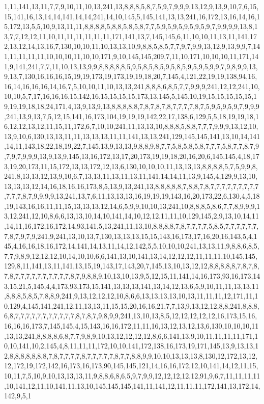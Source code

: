 1,11,141,13,11,7,7,9,10,11,10,13,241,13,8,8,8,5,8,7,5,9,7,9,9,9,13,12,9,13,9,10,7,6,15,15,141,16,13,14,14,141,14,14,241,14,10,145,5,145,141,13,13,241,16,172,13,16,14,16,15,172,13,5,5,10,9,13,11,11,8,8,8,8,5,8,8,5,8,5,8,7,7,5,9,5,9,5,9,5,9,5,9,7,9,9,9,9,13,8,13,7,7,12,12,11,10,11,11,11,11,11,11,171,141,13,7,145,145,6,11,10,10,11,13,11,141,172,13,12,14,13,16,7,130,10,10,11,10,13,13,10,9,8,8,5,8,5,7,7,9,7,9,9,13,12,9,13,9,9,7,141,11,11,11,11,10,10,10,11,10,10,171,9,10,145,145,209,7,11,10,171,10,10,10,11,171,141,9,141,241,7,7,11,10,13,13,9,9,8,8,8,8,8,5,9,5,8,5,8,5,9,5,8,5,9,5,9,5,9,9,7,9,8,9,9,13,9,13,7,130,16,16,16,15,19,19,173,19,173,19,19,18,20,7,145,4,121,22,19,19,138,94,16,16,14,16,16,16,14,16,7,5,10,10,11,10,13,13,241,8,8,8,6,8,5,7,7,9,9,9,241,12,12,241,10,10,10,5,7,17,16,16,16,15,142,16,15,15,15,15,173,13,145,5,145,10,19,15,15,15,15,15,19,19,19,18,18,24,171,4,13,9,13,9,13,8,8,8,8,8,7,8,7,8,7,8,7,7,7,7,8,7,5,9,5,9,5,9,7,9,9,9,241,13,9,13,7,5,12,15,141,16,173,104,19,19,19,142,22,17,138,6,129,5,5,18,19,19,18,16,12,12,13,12,11,15,11,172,6,7,10,10,241,11,13,13,10,8,8,8,5,8,8,7,7,7,9,9,9,13,12,10,13,9,10,6,130,13,13,11,11,13,13,13,11,11,141,13,13,241,129,145,145,141,13,10,14,141,14,11,143,18,22,18,19,22,7,145,13,9,13,13,9,8,8,9,8,7,7,5,8,5,8,5,8,7,7,7,5,8,7,7,8,7,9,7,9,7,9,9,9,13,9,13,9,145,13,16,172,13,17,20,173,19,19,18,20,16,20,6,145,145,4,18,173,19,20,173,11,15,172,13,13,172,12,13,6,130,10,10,10,11,13,13,13,8,8,8,8,5,7,5,9,9,8,241,8,13,13,12,13,9,10,6,7,13,13,11,13,11,13,11,141,14,14,11,13,9,145,4,129,9,13,10,13,13,13,12,14,16,18,16,16,173,8,5,13,9,13,241,13,8,8,8,8,8,7,8,8,7,8,7,7,7,7,7,7,7,7,7,7,7,7,8,7,9,9,9,9,13,241,13,7,6,11,13,13,13,16,19,19,19,143,16,20,173,22,6,130,4,5,18,19,143,16,16,11,11,15,13,13,13,12,14,6,5,9,9,10,10,13,241,10,8,8,8,5,8,6,7,7,8,9,9,9,13,12,241,12,10,8,6,6,13,13,10,14,10,141,14,10,12,12,11,11,10,129,145,2,9,13,10,14,11,14,11,16,172,16,172,14,93,141,5,13,241,11,13,10,8,8,8,8,7,8,7,7,7,7,5,8,5,7,7,7,7,7,7,7,8,7,9,7,9,241,9,241,13,10,13,7,130,13,13,13,15,15,143,16,173,17,16,20,16,143,5,4,145,4,16,16,18,16,172,14,141,14,13,11,14,12,142,5,5,10,10,10,241,13,13,11,9,8,8,6,8,5,7,7,9,8,9,12,12,12,10,14,10,10,6,6,141,13,10,141,13,14,12,12,12,11,11,11,10,145,145,129,8,11,141,13,11,141,13,15,19,143,17,143,20,7,145,13,10,13,12,12,8,8,8,8,8,7,8,7,8,7,8,7,7,7,7,7,7,7,7,7,7,8,7,9,8,8,9,10,13,10,13,9,5,12,15,11,141,14,16,173,93,16,173,143,15,21,5,145,4,4,173,93,173,15,141,13,13,13,141,13,14,12,13,6,5,9,10,11,11,13,13,11,8,8,8,5,8,5,7,8,8,9,241,9,13,12,12,12,10,8,6,6,13,13,13,13,10,13,11,11,11,12,171,11,10,129,4,145,141,241,12,11,13,13,11,15,15,20,16,16,21,7,7,13,9,13,12,12,8,8,241,8,8,8,6,8,7,7,7,7,7,7,7,7,7,7,7,8,7,8,7,9,8,9,9,241,13,10,13,8,5,12,12,12,12,12,16,173,15,16,16,16,16,173,7,145,145,4,15,143,16,16,172,11,11,16,13,12,13,12,13,6,130,10,10,10,11,13,13,241,8,8,8,8,6,8,7,7,9,8,9,10,13,12,12,12,12,8,6,6,141,13,9,10,11,11,11,11,171,10,10,141,10,2,145,4,8,11,11,11,172,10,10,141,172,138,16,173,19,171,145,13,9,13,13,12,8,8,8,8,8,8,8,7,8,7,7,7,7,8,7,7,7,7,7,8,7,7,8,8,9,9,10,10,13,13,13,8,130,12,172,13,12,12,172,19,172,142,16,173,16,173,90,145,145,121,14,16,16,172,12,10,141,14,12,11,15,10,11,7,5,10,9,10,13,13,13,11,9,8,8,6,8,6,5,9,7,9,9,12,12,12,12,12,91,9,6,7,11,11,11,11,10,141,12,11,10,141,11,13,10,145,145,145,141,11,141,12,11,11,11,172,141,13,172,14,142,9,5,1